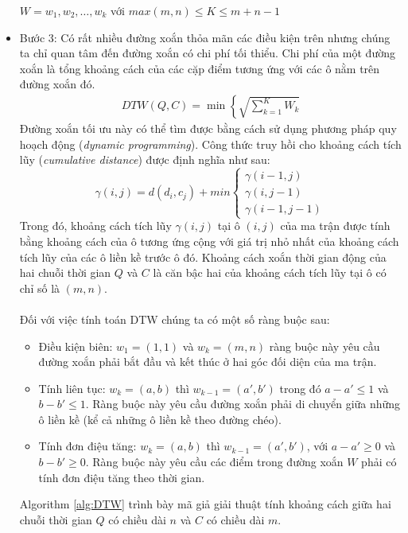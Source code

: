 \documentclass[13pt,oneside]{scrbook}
\begin{document}
\begin{itemize}
$W = w_1, w_2, …, w_k$	 với $max(m, n) \le  K   \le m+ n -1$
\item Bước 3: Có rất nhiều đường xoắn thỏa mãn các điều kiện trên nhưng chúng ta chỉ quan tâm đến đường xoắn có chi phí tối thiểu.
Chi phí của một đường xoắn là tổng khoảng cách của các cặp điểm tương ứng với các ô nằm trên đường xoắn đó.
\begin{align}
DTW\left( {Q,C} \right) = \min \left\{ {\sqrt {\mathop \sum \limits_{k = 1}^K {W_k}} } \right.
\end{align}
Đường xoắn tối ưu này có thể tìm được bằng cách sử dụng phương pháp quy hoạch động (\textit{dynamic programming}). 
Công thức truy hồi cho khoảng cách tích lũy (\textit{cumulative distance})  được định nghĩa như sau:
\begin{equation}\label{eq.dtw}
\gamma(i, j) = d(d_i, c_j) + min
\begin{cases} 
      \gamma(i-1,j) \\
       \gamma(i,j-1) \\
       \gamma(i-1, j-1)
   \end{cases}
\end{equation}
Trong đó, khoảng cách tích lũy $\gamma(i, j)$ tại ô $(i, j)$ của ma trận được tính bằng khoảng cách của ô tương ứng cộng với giá trị nhỏ nhất của khoảng cách tích lũy của các ô liền kề trước ô đó.
Khoảng cách xoắn thời gian động của hai chuỗi thời gian $Q$ và $C$ là căn bậc hai của khoảng cách tích lũy tại ô có chỉ số là $(m,n)$.
\\
\\
Đối với việc tính toán DTW chúng ta có một số ràng buộc sau:
\begin{itemize}
\item Điều kiện biên: $w_1 = (1,1)$ và $w_k=(m, n)$ ràng buộc này yêu cầu đường xoắn phải bắt đầu và kết thúc ở hai góc đối diện của ma trận.
\item Tính liên tục: $w_k = (a,b)$ thì $w_{k-1} = (a', b')$ trong đó $a - a' \le 1$ và $b - b'  \le 1$. 
Ràng buộc này yêu cầu đường xoắn phải di chuyển giữa những ô liền kề (kể cả những ô liền kề theo đường chéo).
\item Tính đơn điệu tăng: $w_k = (a, b)$ thì $w_{k-1} = (a', b')$, với $a - a' \geq 0$ và $b - b' \geq 0$. 
Ràng buộc này yêu cầu các điểm trong đường xoắn $W$ phải có tính đơn điệu tăng theo thời gian.
\end{itemize}
Algorithm \ref{alg:DTW} trình bày mã giả giải thuật tính khoảng cách giữa hai chuỗi thời gian $Q$ có chiều dài $n$ và $C$ có chiều dài $m$.


\end{itemize}
\end{document}
